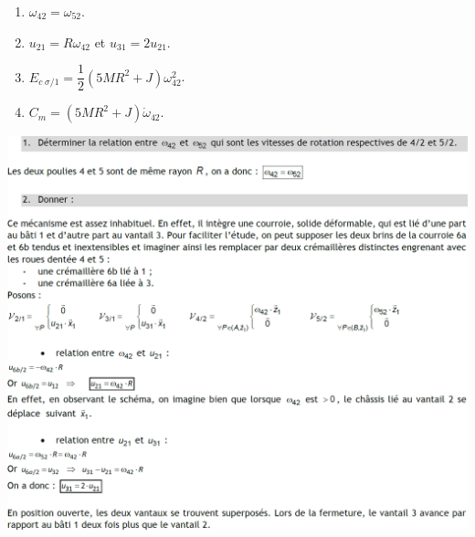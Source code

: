 \documentclass[10pt,fleqn]{article} %
\begin{document}
\begin{multicols}{2}
\begin{enumerate}
\item $\omega_{42}=\omega_{52}$.
\item $u_{21}=R\omega_{42}$ et $u_{31}=2u_{21}$.
\item $E_{c\; \sigma/1} = \dfrac{1}{2}\left(5MR^2+J\right)\omega_{42}^2$.
\item $C_m=\left(5MR^2+J\right)\dot{\omega}_{42}$.
\end{enumerate}

\ifprof
\else
\end{multicols}
\fi

\newpage

\begin{center}
\includegraphics[width=\linewidth]{images/cor_01.png}
\end{center}
\end{document}
